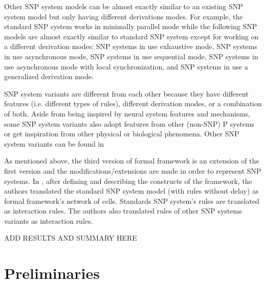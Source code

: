 \documentclass[a4paper]{article}
\theoremstyle{definition}
\begin{document}
Other SNP system models can be almost exactly similar to an existing SNP system model but only 
having different derivations modes. For example, the standard SNP system works in minimally parallel
mode while the following SNP models are almost exactly similar to standard SNP system except for 
working on a different derivation modes:  SNP systems in \cite{ionescu-2007-exhaustive} use 
exhaustive mode, SNP systems in \cite{cavaliere-2009-asynchronous} use asynchronous mode, SNP 
systems in \cite{ibarra-2009-min-max-sequential} use sequential mode, SNP systems in 
\cite{song-2013-local-sync} use asynchronous mode with local synchronization, and SNP systems in                                 
\cite{zhang-2014-general-rule-use,jiang-2019-improved-usnp-general-rule-use} use a generalized       
derivation mode.

SNP system variants are different from each other because they have different features (i.e. 
different types of rules), different derivation modes, or a combination of both. Aside from being 
inspired by neural system features and mechanisms, some SNP system variants also adopt features from 
other (non-SNP) P systems or get inspiration from other physical or biological phenomena. Other 
SNP system variants can be found in                                                                                      
\cite{chen-2008-snp-e,alhazov-2006-esnp,chen-2007-axon-p,pan-2009-anti-spikes,song-2014-rules-on-synapses,metta-2014-cooperating-rules,wu-2016-cell-like,song-2016-request-rules,pan-2017-communication-on-request,song-2018-colored-spikes}  

As mentioned above, the third version of formal framework \cite{verlan-2020-ff-3} is an extension of 
the first version and the modifications/extensions are made in order to represent SNP systems. In 
\cite{verlan-2020-ff-3}, after defining and describing the constructs of the framework, the authors 
translated the standard SNP system model (with rules without delay) as formal framework's network of 
cells. Standards SNP system's rules are translated as interaction rules. The authors also translated
 rules of other SNP systems variants
\cite{chen-2008-snp-e,pan-2012-weighted-synapses,alhazov-2006-esnp,peng-2017-multiple-channels,pan-2012-astrocytes} 
as interaction rules.  

ADD RESULTS AND SUMMARY HERE


\section{Preliminaries}\label{sec-preliminaries}
\end{document}
